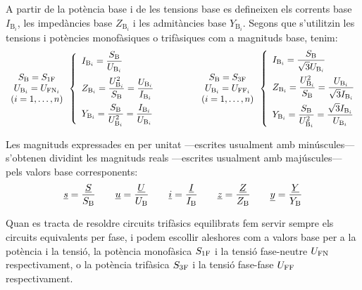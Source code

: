 A partir de la potència base i de les tensions base es
defineixen els corrents base $I_{\text{B}_i}$, les impedàncies base $Z_{\text{B}_i}$ i les
admitàncies base $Y_{\text{B}_i}$. Segons que s'utilitzin les tensions i potències monofàsiques o trifàsiques com a magnituds base, tenim:
\begin{equation}
\begin{array}{c}  S_\mathrm{B}=S_\mathrm{1F} \\ U_{\text{B}_i} = U_{\text{FN}_i} \\ (i=1,\ldots,n) \end{array}
\left\{
\begin{array}{l}
   I_{\text{B}_i} = \dfrac{S_\mathrm{B}}{U_{\text{B}_i}} \\[2.5ex]
   Z_{\text{B}_i} = \dfrac{U_{\text{B}_i}^2}{S_\mathrm{B}} = \dfrac{U_{\text{B}_i}}{I_{\text{B}_i}} \\[2.5ex]
   Y_{\text{B}_i} = \dfrac{S_\mathrm{B}}{U_{\text{B}_i}^2} = \dfrac{I_{\text{B}_i}}{U_{\text{B}_i}}
\end{array}
\right.
\qquad\qquad
\begin{array}{c} S_\mathrm{B}=S_\mathrm{3F} \\ U_{\text{B}_i} = U_{\text{FF}_i} \\ (i=1,\ldots,n) \end{array}
\left\{
\begin{array}{l}
   I_{\text{B}_i} = \dfrac{S_\mathrm{B}}{\sqrt{3} U_{\text{B}_i}} \\[2.5ex]
   Z_{\text{B}_i} = \dfrac{U_{\text{B}_i}^2}{S_\mathrm{B}}= \dfrac{U_{\text{B}_i}}{\sqrt{3} I_{\text{B}_i}} \\[2.5ex]
   Y_{\text{B}_i} = \dfrac{S_\mathrm{B}}{U_{\text{B}_i}^2} = \dfrac{\sqrt{3} I_{\text{B}_i}}{U_{\text{B}_i}}
\end{array}
\right.
\label{eq:bases_pu}
\end{equation}

Les magnituds expressades en per unitat ---escrites usualment amb minúscules--- s'obtenen
dividint les magnituds reals ---escrites usualment amb majúscules--- pels valors base corresponents:
\begin{equation}
   \underline{s} = \frac{\underline{S}}{S_\mathrm{B}} \qquad \underline{u} = \frac{\underline{U}}{U_\mathrm{B}} \qquad \underline{i} = \frac{\underline{I}}{I_\mathrm{B}} \qquad \underline{z} = \frac{\underline{Z}}{Z_\mathrm{B}} \qquad \underline{y} = \frac{\underline{Y}}{Y_\mathrm{B}}
\end{equation}

Quan es tracta de resoldre circuits trifàsics equilibrats fem servir sempre els circuits equivalents per fase, i podem escollir aleshores com a valors base per a la potència i la tensió, la potència monofàsica $S_\mathrm{1F}$ i la tensió fase-neutre $U_\mathrm{FN}$ respectivament, o la potència trifàsica $S_\mathrm{3F}$ i la tensió fase-fase $U_\mathrm{FF}$ respectivament.


